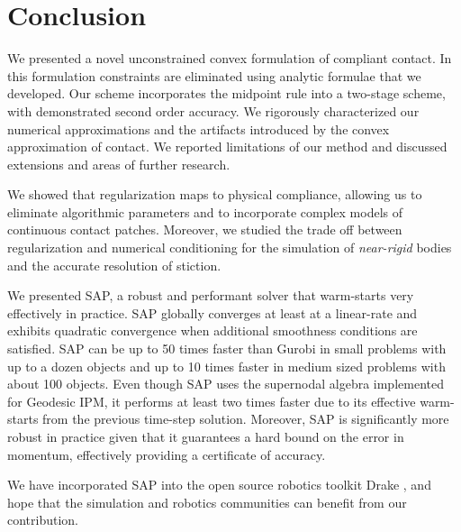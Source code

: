 \section{Conclusion}
\label{sec:future_directions}

We presented a novel unconstrained convex formulation of compliant contact. In
this formulation constraints are eliminated using analytic formulae that we
developed. Our scheme incorporates the midpoint rule into a two-stage scheme,
with demonstrated second order accuracy. We rigorously characterized our
numerical approximations and the artifacts introduced by the convex
approximation of contact. We reported limitations of our method and discussed
extensions and areas of further research.

We showed that regularization maps to physical compliance, allowing us to
eliminate algorithmic parameters and to incorporate complex models of continuous
contact patches. Moreover, we studied the trade off between regularization and
numerical conditioning for the simulation of \emph{near-rigid} bodies and
the accurate resolution of stiction.

We presented SAP, a robust and performant solver that warm-starts very
effectively in practice. SAP globally converges at least at a linear-rate and
exhibits quadratic convergence when additional smoothness conditions are
satisfied. SAP can be up to 50 times faster than Gurobi in small problems with
up to a dozen objects and up to 10 times faster in medium sized problems with
about 100 objects. Even though SAP uses the supernodal algebra implemented for
Geodesic IPM, it performs at least two times faster due to its effective
warm-starts from the previous time-step solution. Moreover, SAP is significantly
more robust in practice given that it guarantees a hard bound on the error in
momentum, effectively providing a certificate of accuracy.

We have incorporated SAP into the open source robotics toolkit Drake
\cite{bib:drake}, and hope that the simulation and robotics communities can
benefit from our contribution.
